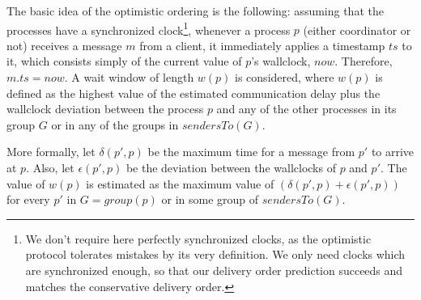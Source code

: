\documentclass[times, 10pt]{article}
\begin{document}


The basic idea of the optimistic ordering is the following: assuming that the processes have a synchronized clock\footnote{We don't require here perfectly synchronized clocks, as the optimistic protocol tolerates mistakes by its very definition. We only need clocks which are synchronized enough, so that our delivery order prediction succeeds and matches the conservative delivery order.}, whenever a process $p$ (either coordinator or not) receives a message $m$ from a client, it immediately applies a timestamp $ts$ to it, which consists simply of the current value of $p$'s wallclock, $now$. Therefore, $m.ts=now$. A wait window of length $w(p)$ is considered, where $w(p)$ is defined as the highest value of the estimated communication delay plus the wallclock deviation between the process $p$ and any of the other processes in its group $G$ or in any of the groups in $sendersTo(G)$.

More formally, let $\delta(p',p)$ be the maximum time for a message from $p'$ to arrive at $p$. Also, let $\epsilon(p',p)$ be the deviation between the wallclocks of $p$ and $p'$. The value of $w(p)$ is estimated as the maximum value of $(\delta(p',p) + \epsilon(p',p))$ for every $p'$ in $G = group(p)$ or in some group of $sendersTo(G)$.
\end{document}
